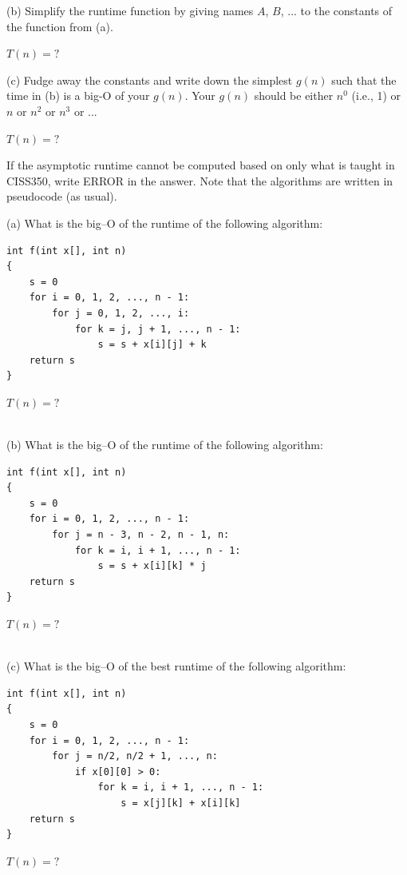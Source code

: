 (b) Simplify the runtime function by giving names $A$, $B$, ...
to the constants of the function from (a).
\\
\ANSWER
\begin{answerlong}
$T(n) = ?$
\end{answerlong}

(c) Fudge away the constants and write down the simplest $g(n)$ such 
that the time in (b) is a big-O of your $g(n)$.
Your $g(n)$ should be either $n^0$ (i.e., 1) or $n$ or $n^2$ or $n^3$ or ...
\\
\ANSWER
\begin{answerlong}
$T(n) = ?$
\end{answerlong}

\newpage
\nextq %

If the asymptotic runtime cannot be computed based on only what is taught in CISS350,
write ERROR in the answer.
Note that the algorithms are written in pseudocode (as usual).

(a)
What is the big--O of the runtime of the following algorithm:
\begin{Verbatim}[frame=single]
int f(int x[], int n)
{
    s = 0
    for i = 0, 1, 2, ..., n - 1:
        for j = 0, 1, 2, ..., i:
            for k = j, j + 1, ..., n - 1:
                s = s + x[i][j] + k
    return s
}
\end{Verbatim}
\ANSWER
\begin{answerlong}
$T(n) = ?$
\end{answerlong}


\mbox{}\\
(b)
What is the big--O of the runtime of the following algorithm:
\begin{Verbatim}[frame=single]
int f(int x[], int n)
{
    s = 0
    for i = 0, 1, 2, ..., n - 1:
        for j = n - 3, n - 2, n - 1, n:
            for k = i, i + 1, ..., n - 1:
                s = s + x[i][k] * j
    return s
}
\end{Verbatim}
\ANSWER
\begin{answerlong}
$T(n) = ?$
\end{answerlong}


\mbox{}\\
(c)
What is the big--O of the best runtime of the following algorithm:
\begin{Verbatim}[frame=single]
int f(int x[], int n)
{
    s = 0
    for i = 0, 1, 2, ..., n - 1:
        for j = n/2, n/2 + 1, ..., n:
            if x[0][0] > 0:
                for k = i, i + 1, ..., n - 1:
                    s = x[j][k] + x[i][k]
    return s
}
\end{Verbatim}
\ANSWER
\begin{answerlong}
$T(n) = ?$
\end{answerlong}


